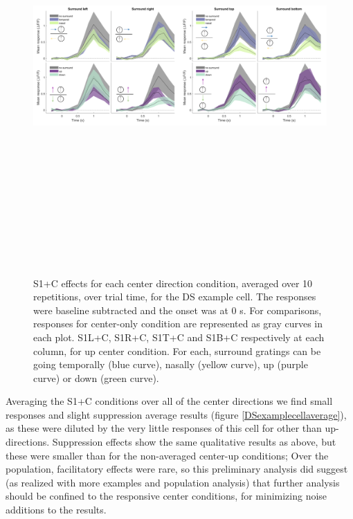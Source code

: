 \begin{figure}[H] \centering \includegraphics[width=15.9cm,height=15.9cm,keepaspectratio]{Figures/7.Results/individualSM/roi_29_mf379_pos5/3.png} 
\caption{S1+C effects for each center direction condition, averaged over 10 repetitions, over trial time, for the DS example cell. The responses were baseline subtracted and the onset was at 0 s. For comparisons, responses for center-only condition are represented as gray curves in each plot.
S1L+C, S1R+C, S1T+C and S1B+C respectively at each column, for up center condition. For each, surround gratings can be going temporally (blue curve), nasally (yellow curve), up (purple curve) or down (green curve).}
\label{DSexamplecellSM}
\end{figure}

Averaging the S1+C conditions over all of the center directions we find small responses and slight suppression average results (figure \ref{DSexamplecellaverage}), as these were diluted by the very little responses of this cell for other than up-directions. Suppression effects show the same qualitative results as above, but these were smaller than for the non-averaged center-up conditions; Over the population, facilitatory effects were rare, so this preliminary analysis did suggest (as realized with more examples and population analysis) that further analysis should be confined to the responsive center conditions, for minimizing noise additions to the results.

